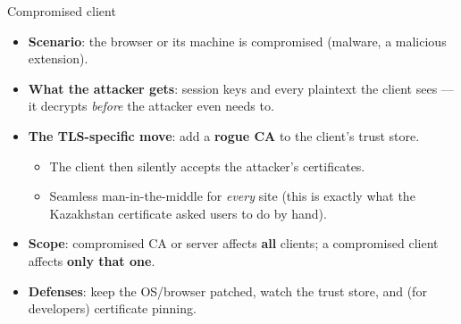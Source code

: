 \ifdefined\PRESENTATION\else\PassOptionsToClass{handout}{beamer}\fi\documentclass[aspectratio=169, lualatex]{beamer}
\begin{document}
\begin{frame}{Compromised client}
	\begin{itemize}[<+->]
		\item \textbf{Scenario}: the browser or its machine is compromised (malware, a malicious extension).
		\item \textbf{What the attacker gets}: session keys and every plaintext the client sees --- it decrypts \emph{before} the attacker even needs to.
		\item \textbf{The TLS-specific move}: add a \textbf{rogue CA} to the client's trust store.
		      \begin{itemize}
			      \item The client then silently accepts the attacker's certificates.
			      \item Seamless man-in-the-middle for \emph{every} site (this is exactly what the Kazakhstan certificate asked users to do by hand).
		      \end{itemize}
		\item \textbf{Scope}: compromised CA or server affects \textbf{all} clients; a compromised client affects \textbf{only that one}.
		\item \textbf{Defenses}: keep the OS/browser patched, watch the trust store, and (for developers) certificate pinning.
	\end{itemize}
\end{frame}
\end{document}
